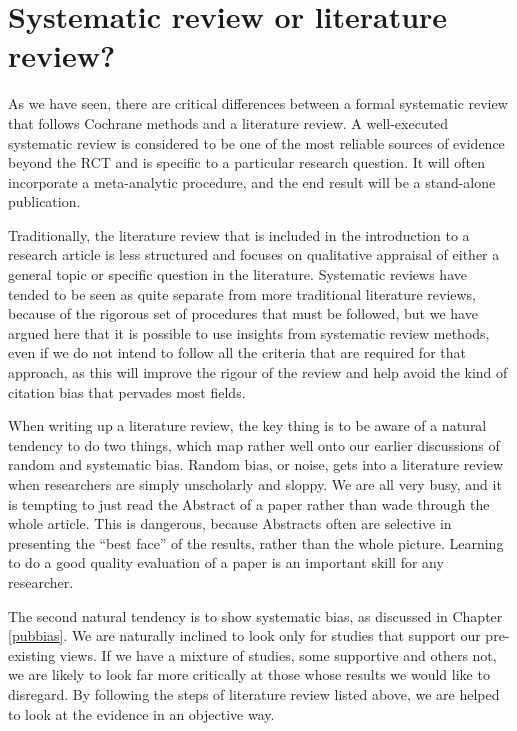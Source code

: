 \documentclass{krantz}
\begin{document}
\hypertarget{systematic-review-or-literature-review}{%
\section{Systematic review or literature review?}\label{systematic-review-or-literature-review}}

As we have seen, there are critical differences between a formal systematic review that follows Cochrane methods and a literature review. A well-executed systematic review is considered to be one of the most reliable sources of evidence beyond the RCT and is specific to a particular research question. It will often incorporate a meta-analytic procedure, and the end result will be a stand-alone publication.

Traditionally, the literature review that is included in the introduction to a research article is less structured and focuses on qualitative appraisal of either a general topic or specific question in the literature. Systematic reviews have tended to be seen as quite separate from more traditional literature reviews, because of the rigorous set of procedures that must be followed, but we have argued here that it is possible to use insights from systematic review methods, even if we do not intend to follow all the criteria that are required for that approach, as this will improve the rigour of the review and help avoid the kind of citation bias that pervades most fields.

When writing up a literature review, the key thing is to be aware of a natural tendency to do two things, which map rather well onto our earlier discussions of random and systematic bias. Random bias, or noise, gets into a literature review when researchers are simply unscholarly and sloppy. We are all very busy, and it is tempting to just read the Abstract of a paper rather than wade through the whole article. This is dangerous, because Abstracts often are selective in presenting the ``best face'' of the results, rather than the whole picture. Learning to do a good quality evaluation of a paper is an important skill for any researcher.

The second natural tendency is to show systematic bias, as discussed in Chapter \ref{pubbias}. We are naturally inclined to look only for studies that support our pre-existing views. If we have a mixture of studies, some supportive and others not, we are likely to look far more critically at those whose results we would like to disregard. By following the steps of literature review listed above, we are helped to look at the evidence in an objective way.
\end{document}
